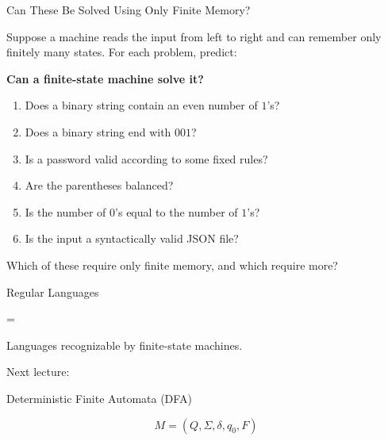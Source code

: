 \documentclass[10pt,aspectratio=169]{beamer}
\begin{document}
\begin{frame}{Can These Be Solved Using Only Finite Memory?}

Suppose a machine reads the input from left to right and can remember
only finitely many states. For each problem, predict:

\begin{center}
\textbf{Can a finite-state machine solve it?}
\end{center}

\begin{enumerate}
\item Does a binary string contain an even number of \(1\)'s?
\pause
\item Does a binary string end with \(001\)?
\pause
\item Is a password valid according to some fixed rules?
\pause
\item Are the parentheses balanced?
\pause
\item Is the number of \(0\)'s equal to the number of \(1\)'s?
\pause
\item Is the input a syntactically valid JSON file?
\end{enumerate}

\vfill

\pause
\begin{center}
\alert{Which of these require only finite memory, and which require more?}
\end{center}

\end{frame}
\begin{frame}[standout]

Regular Languages

=

Languages recognizable by finite-state machines.

\end{frame}

\begin{frame}[standout]

Next lecture:

Deterministic Finite Automata (DFA)

\[
M=(Q,\Sigma,\delta,q_0,F)
\]

\end{frame}

\end{document}
